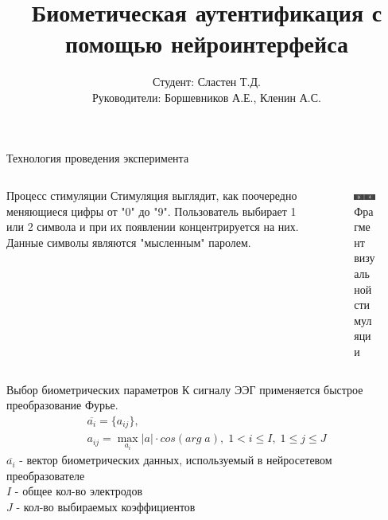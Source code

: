 \documentclass{beamer}
\title{Биометическая аутентификация с помощью нейроинтерфейса}
\author{Студент: Сластен Т.Д. \\ Руководители: Боршевников А.Е., Кленин А.С.}
\institute{Б8303а Прикладная математика и информатика}
\date{}
\begin{document}
\maketitle

\begin{frame}{Технология проведения эксперимента}
	\begin{columns}[T]
  		\begin{column}{.6\textwidth}
     		\begin{block}{Процесс стимуляции}
				Стимуляция выглядит, как поочередно меняющиеся цифры от "0" до "9".
				Пользователь выбирает 1 или 2 символа и при их появлении концентрируется на них.
				Данные символы являются "мысленным" паролем.
    		\end{block}
    	\end{column}
    	\begin{column}{.4\textwidth}
    		\begin{figure}
    			\includegraphics[width=\textwidth]{img/0_4.png}
    			\caption{Фрагмент визуальной стимуляции}
    		\end{figure}
    	\end{column}
  	\end{columns}
\end{frame}

\begin{frame}{Выбор биометрических параметров}
	К сигналу ЭЭГ применяется быстрое преобразование Фурье.
	\begin{gather*}
		\overline{a_i} = \{ a_{ij} \}, \\
		a_{ij} = \max_{a_i}|a| \cdot cos(arg \; a),\; 1 < i \leq I,\; 1 \leq j \leq J
	\end{gather*}
	$\overline{a_i}$ - вектор биометрических данных, используемый в нейросетевом преобразователе \\
	$I$ - общее кол-во электродов \\
	$J$ - кол-во выбираемых коэффициентов
\end{frame}
\end{document}
